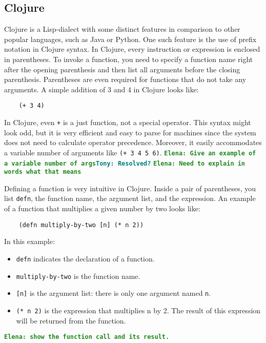 \documentclass[12pt]{article}
\newcommand{\comment}[1]{{\bf \tt  {#1}}}
\newcommand{\emcomment}[1]{\textcolor{ForestGreen}{\comment{Elena: {#1}}}}
\newcommand{\tscomment}[1]{\textcolor{Teal}{\comment{Tony: {#1}}}}
\begin{document}
	\subsection{Clojure}
	Clojure is a Lisp-dialect with some distinct features in comparison to other popular languages, such as Java or Python.
	One such feature is the use of prefix notation in Clojure syntax. In Clojure, every instruction or expression is enclosed in parentheses.
	To invoke a function, you need to specify a function name right after the opening parenthesis and then list all arguments before the 
	closing parenthesis. Parentheses are even required for functions that do not take any arguments.  
	A simple addition of 3 and 4 in Clojure looks like: 
	\begin{verbatim}
	(+ 3 4)
	\end{verbatim}
	In Clojure, even \texttt{+} is a just function, not a special operator. This syntax might look odd, but it is very efficient and easy to parse for machines since the system does not need to 
	calculate operator precedence. Moreover, it easily accommodates a variable number of arguments like {\tt (+ 3 4 5 6)}.
	\emcomment{Give an example of a variable number of args}\tscomment{Resolved?}
	\emcomment{Need to explain in words what that means}
	
	Defining a function is very intuitive in Clojure. Inside a pair of parentheses, you list \texttt{defn}, the function name, 
	the argument list, and the expression. 
	An example of a function that multiplies a given number by two looks like:
	 \begin{verbatim}
	(defn multiply-by-two [n] (* n 2))
	\end{verbatim}
	In this example:
	\begin{itemize}
	\item {\tt defn} indicates the declaration of a function.
	\item {\tt multiply-by-two} is the function name.
	\item \texttt{[n]} is the argument list: there is only one argument named {\tt n}.
	\item {\tt (* n 2)} is the expression that multiplies n by 2. The result of this expression will be returned from the function. 
	\end{itemize}
	\emcomment{show the function call and its result. }
	
\end{document}
